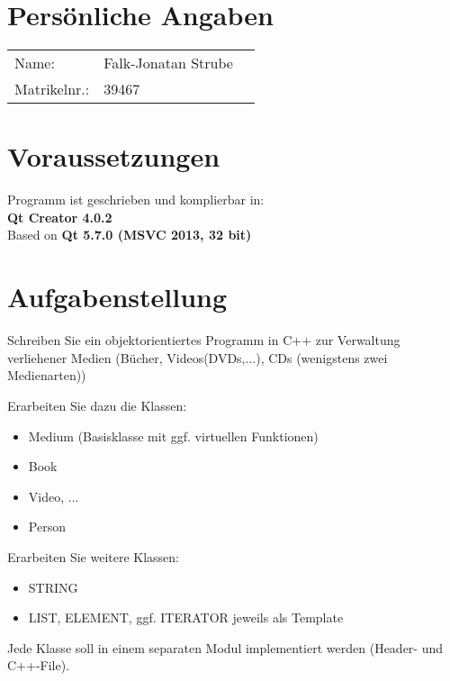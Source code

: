 \newcommand{\customDir}{../../}




\setCustomSignature{}	%
\setCustomTitleAuthor{\textcolor{darkgray}{\customAuthor}}	%




%



\maketitle
\newpage

\section*{Persönliche Angaben}
\begin{tabular}{l l l}
Name: 					&Falk-Jonatan Strube\\
Matrikelnr.:		&39467\\
\end{tabular}

\section*{Voraussetzungen}
Programm ist geschrieben und komplierbar in:\\
\textbf{Qt Creator 4.0.2}\\
Based on \textbf{Qt 5.7.0 (MSVC 2013, 32 bit)}

\section*{Aufgabenstellung}
Schreiben Sie ein objektorientiertes Programm in C++ zur Verwaltung verliehener Medien (Bücher, Videos(DVDs,...), CDs (wenigstens zwei Medienarten))

Erarbeiten Sie dazu die Klassen:
\begin{itemize}
\item Medium (Basisklasse mit ggf. virtuellen Funktionen)
\item Book
\item Video, ...
\item Person
\end{itemize}
Erarbeiten Sie weitere Klassen:
\begin{itemize}
\item STRING
\item LIST, ELEMENT, ggf. ITERATOR jeweils als Template
\end{itemize}
Jede Klasse soll in einem separaten Modul implementiert werden (Header- und C++-File).


